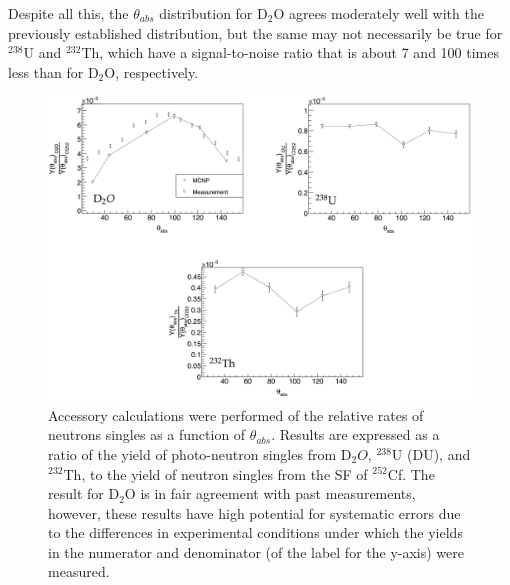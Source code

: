 Despite all this, the $\theta_{abs}$ distribution for D$_{2}$O agrees moderately well with the previously established distribution, but the same may not necessarily be true for $^{238}$U and $^{232}$Th, which have a signal-to-noise ratio that is about 7 and 100 times less than for D$_{2}$O, respectively.

\begin{figure}
    \includegraphics[width = 1\textwidth]{Content/Results/Singles.png}
    \caption{Accessory calculations were performed of the relative rates of neutrons singles as a function of $\theta_{abs}$. 
    Results are expressed as a ratio of the yield of photo-neutron singles from D$_{2}O$, $^{238}$U (DU), and $^{232}$Th, to the yield of neutron singles from the SF of $^{252}$Cf.
   The result for D$_{2}$O is in fair agreement with past measurements, however, these results have high potential for systematic errors due to the differences in experimental conditions under which the yields in the numerator and denominator (of the label for the y-axis) were measured.
       }
    \label{fig:Singles}
\end{figure}
\FloatBarrier